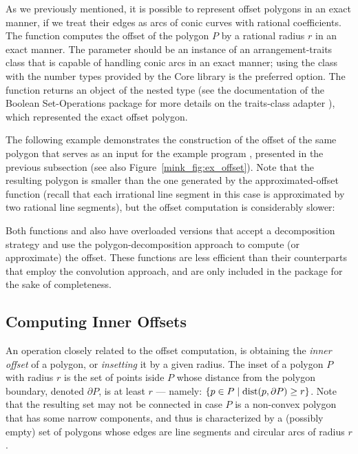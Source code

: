 As we previously mentioned, it is possible to represent offset polygons
in an exact manner, if we treat their edges as arcs of conic curves with
rational coefficients. The function 
computes the offset of the polygon $P$ by a rational radius $r$ in an
exact manner. The  parameter should be an instance of an
arrangement-traits class that is capable of handling conic arcs in an
exact manner; using the  class with the number
types provided by the {\sc Core} library is the preferred option.
The function returns an object of the nested type
 (see the
documentation of the Boolean Set-Operations package for more details
on the traits-class adapter ), which represented the
exact offset polygon.

The following example demonstrates the construction of the offset
of the same polygon that serves as an input for the example program
, presented in the
previous subsection (see also Figure~\ref{mink_fig:ex_offset}).
Note that the resulting polygon is smaller than the one generated by the
approximated-offset function (recall that each irrational line segment in
this case is approximated by two rational line segments), but the offset
computation is considerably slower:


\begin{ccAdvanced}
Both functions  and 
also have overloaded versions that accept a decomposition strategy
and use the polygon-decomposition approach to compute (or approximate)
the offset. These functions are less efficient than their counterparts
that employ the convolution approach, and are only included in the package
for the sake of completeness.
\end{ccAdvanced}

\subsection{Computing Inner Offsets\label{mink_ssec:inner_offset}}

An operation closely related to the offset computation, is obtaining the
{\em inner offset} of a polygon, or {\em insetting} it by a given radius.
The inset of a polygon $P$ with radius $r$ is the set of points iside $P$
whose distance from the polygon boundary, denoted $\partial P$, is at least
$r$ --- namely: $\{ p \in P \;|\; {\rm dist}(p, \partial P) \geq r \}$.
Note that the resulting set may not be connected in case $P$ is a non-convex
polygon that has some narrow components, and thus is characterized by a
(possibly empty) set of polygons whose edges are line segments and circular
arcs of radius $r$.

